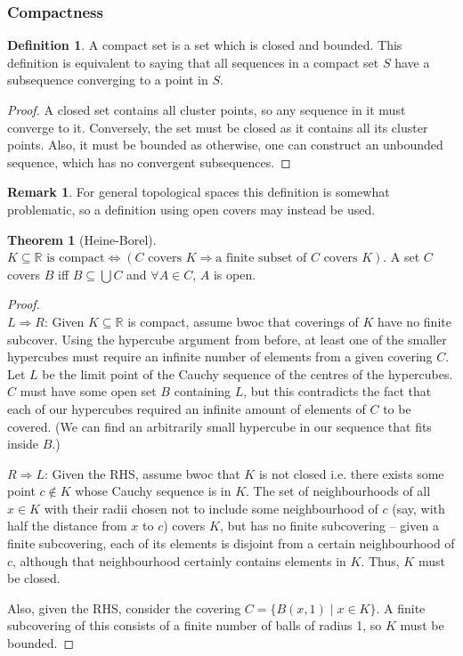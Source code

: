 \documentclass{article}
\theoremstyle{definition}
\newtheorem{thm}{Theorem}[subsubsection]
\newtheorem{defn}{Definition}[subsubsection]
\newtheorem{rmk}{Remark}[subsubsection]
\begin{document}
\subsubsection{Compactness}
\begin{defn}
	A compact set is a set which is closed and bounded. This definition is equivalent to saying that all sequences in a compact set $S$ have a subsequence converging to a point in $S$.
\end{defn}
\begin{proof}
	A closed set contains all cluster points, so any sequence in it must converge to it. Conversely, the set must be closed as it contains all its cluster points. Also, it must be bounded as otherwise, one can construct an unbounded sequence, which has no convergent subsequences.
\end{proof}
\begin{rmk}
	For general topological spaces this definition is somewhat problematic, so a definition using open covers may instead be used.
\end{rmk}
\begin{thm}[Heine-Borel]
	$K\subseteq \mathbb{R}\text{ is compact}\iff (C\text{ covers }K\Rightarrow \text{a finite subset of }C\text{ covers }K)$. A set $C$ covers $B$ iff $B\subseteq\bigcup C$ and $\forall A\in C$, $A$ is open.
\end{thm}
\begin{proof}
	$ $\\$L\Rightarrow R$: Given $K\subseteq \mathbb{R}$ is compact, assume bwoc that coverings of $K$ have no finite subcover. Using the hypercube argument from before, at least one of the smaller hypercubes must require an infinite number of elements from a given covering $C$. Let $L$ be the limit point of the Cauchy sequence of the centres of the hypercubes. $C$ must have some open set $B$ containing $L$, but this contradicts the fact that each of our hypercubes required an infinite amount of elements of $C$ to be covered. (We can find an arbitrarily small hypercube in our sequence that fits inside $B$.)\par

	$ $\\$R\Rightarrow L$: Given the RHS, assume bwoc that $K$ is not closed i.e. there exists some point $c\not\in K$ whose Cauchy sequence is in $K$. The set of neighbourhoods of all $x\in K$ with their radii chosen not to include some neighbourhood of $c$ (say, with half the distance from $x$ to $c$) covers $K$, but has no finite subcovering -- given a finite subcovering, each of its elements is disjoint from a certain neighbourhood of $c$, although that neighbourhood certainly contains elements in $K$. Thus, $K$ must be closed.\par
	Also, given the RHS, consider the covering $C=\{B(x,1)\mid x\in K\}$. A finite subcovering of this consists of a finite number of balls of radius 1, so $K$ must be bounded.
\end{proof}
\end{document}
